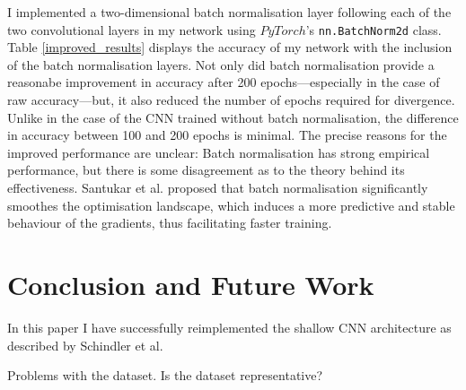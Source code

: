 \documentclass[conference]{IEEEtran}
\begin{document}
I implemented a two-dimensional batch normalisation layer following each of the two convolutional layers in my network using $PyTorch$'s \texttt{nn.BatchNorm2d} class.
Table \ref{improved_results} displays the accuracy of my network with the inclusion of the batch normalisation layers.
Not only did batch normalisation provide a reasonabe improvement in accuracy after 200 epochs---especially in the case of raw accuracy---but, it also reduced the number of epochs required for divergence.
Unlike in the case of the CNN trained without batch normalisation, the difference in accuracy between 100 and 200 epochs is minimal.
The precise reasons for the improved performance are unclear: Batch normalisation has strong empirical performance, but there is some disagreement as to the theory behind its effectiveness.
Santukar et al. \cite{SanturkarEtAl} proposed that batch normalisation significantly smoothes the optimisation landscape, which induces a more predictive and stable behaviour of the gradients, thus facilitating faster training.

\section{Conclusion and Future Work}

In this paper I have successfully reimplemented the shallow CNN architecture as described by Schindler et al.

Problems with the dataset. Is the dataset representative?



\end{document}
